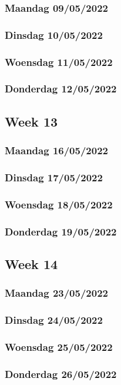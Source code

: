 \subsubsection{Maandag 09/05/2022}

\subsubsection{Dinsdag 10/05/2022}

\subsubsection{Woensdag 11/05/2022}

\subsubsection{Donderdag 12/05/2022}

\subsection{Week 13}

\subsubsection{Maandag 16/05/2022}

\subsubsection{Dinsdag 17/05/2022}

\subsubsection{Woensdag 18/05/2022}

\subsubsection{Donderdag 19/05/2022}

\subsection{Week 14}

\subsubsection{Maandag 23/05/2022}

\subsubsection{Dinsdag 24/05/2022}

\subsubsection{Woensdag 25/05/2022}

\subsubsection{Donderdag 26/05/2022}